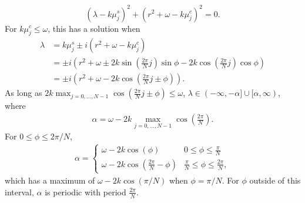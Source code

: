 \documentclass[11pt,reqno]{amsart}
\begin{document}
\begin{equation*}
(\lambda - k \mu_j^s)^2  + (r^2 + \omega - k \mu_j^c)^2 = 0.
\end{equation*}
For $k \mu_j^c \leq \omega$, this has a solution when
\begin{align*}
\lambda &= k \mu_j^s  \pm i (r^2 + \omega - k \mu_j^c) \\
&= \pm i \left( r^2 + \omega \pm 2 k \sin\left( \frac{2 \pi}{N} j\right) \sin \phi 
- 2 k \cos\left( \frac{2 \pi}{N} j\right) \cos \phi
\right) \\
&= \pm i \left( r^2 + \omega - 2k \cos \left( \frac{2 \pi}{N} j \pm \phi \right) \right).
\end{align*}
As long as $2k \max_{j=0,\dots,N-1} \cos \left( \frac{2 \pi}{N} j \pm \phi \right) \leq \omega$, $\lambda \in (-\infty,-\alpha]\cup[\alpha, \infty)$, where
\begin{align}\label{eq:alpha1}
\alpha = \omega - 2k \max_{j=0,\dots,N-1} \cos \left( \frac{2 \pi}{N} \right).
\end{align}
For $0 \leq \phi \leq 2 \pi/N$, 
\begin{align*}
\alpha = \begin{cases}
\omega - 2 k \cos\left(\phi\right) & 0 \leq \phi \leq \frac{\pi}{N} \\
\omega - 2 k \cos\left(\frac{2\pi}{N}-\phi\right) & \frac{\pi}{N} \leq \phi \leq \frac{2\pi}{N},
\end{cases}
\end{align*}
which has a maximum of $\omega - 2 k \cos\left(\pi/N\right)$ when $\phi = \pi/N$. For $\phi$ outside of this interval, $\alpha$ is periodic with period $\frac{2\pi}{N}$. 



\end{document}
